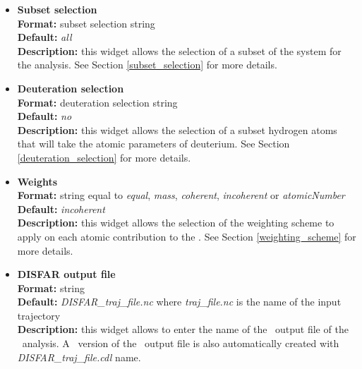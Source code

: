\documentclass[a4paper,11pt]{report}
\begin{document}
\begin{itemize}
\item \textbf{Subset selection}\\
\textbf{Format:} subset selection string\\
\textbf{Default:} \textit{all}\\
\textbf{Description:} this widget allows the selection of a subset of the system for the analysis. 
See Section \ref{subset_selection} for more details.

\item \textbf{Deuteration selection}\\
\textbf{Format:} deuteration selection string\\
\textbf{Default:} \textit{no}\\
\textbf{Description:} this widget allows the selection of a subset hydrogen atoms that will take the atomic parameters 
of deuterium. See Section \ref{deuteration_selection} for more details.

\item \textbf{Weights}\\
\textbf{Format:} string equal to \textit{equal}, \textit{mass}, \textit{coherent}, \textit{incoherent} or \textit{atomicNumber}\\
\textbf{Default:} \textit{incoherent}\\
\textbf{Description:} this widget allows the selection of the weighting scheme to apply on each atomic contribution 
to the \DISFAR . See Section \ref{weighting_scheme} for more details. 

\item \textbf{DISFAR output file}\\
\textbf{Format:} string\\
\textbf{Default:} \textit{DISFAR\_traj\_file.nc} where \textit{traj\_file.nc} is the name of the input trajectory\\
\textbf{Description:} this widget allows to enter the name of the \NetCDF\ output file of the \DISFAR\ analysis. A \CDL\ 
version of the \NetCDF\ output file is also automatically created with \textit{DISFAR\_traj\_file.cdl} name.
\end{itemize}
\end{document}
